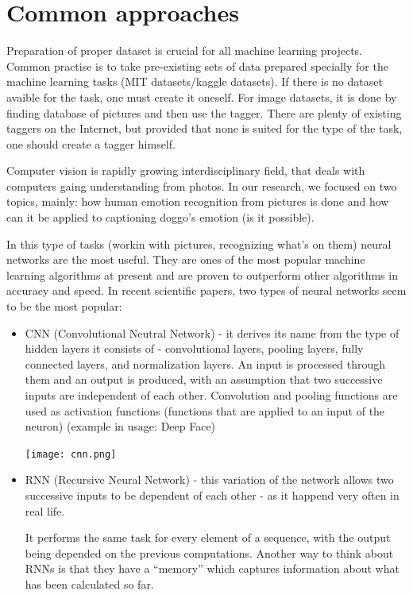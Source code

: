 \documentclass[11pt]{diazessay} %
\begin{document}
\section*{Common approaches}

Preparation of proper dataset is crucial for all machine learning projects. Common practise is to take pre-existing sets of data prepared specially for the machine learning tasks (MIT datasets/kaggle datasets). If there is no dataset avaible for the task, one must create it oneself. For image datasets, it is done by finding database of pictures and then use the tagger. There are plenty of existing taggers on the Internet, but provided that none is suited for the type of the task, one should create a tagger himself.

Computer vision is rapidly growing interdisciplinary field, that deals with computers gaing understanding from photos. In our research, we focused on two topics, mainly: how human emotion recognition from pictures is done and how can it be applied to captioning doggo's emotion (is it possible).

In this type of tasks (workin with pictures, recognizing what's on them) neural networks are the most useful. They are ones of the most popular machine learning algorithms at present and are proven to outperform other algorithms in accuracy and speed. 
In recent scientific papers, two types of neural networks seem to be the most popular: 
\begin{itemize}
	\item CNN (Convolutional Neutral Network) - it derives its name from the type of hidden layers it consists of - convolutional layers, pooling layers, fully connected layers, and normalization layers. An input is processed through them and an output is produced, with an assumption that two successive inputs are independent of each other. 
Convolution and pooling functions are used as activation functions (functions that are applied to an input of the neuron) (example in usage: Deep Face)
	
\begin{center}%
	\texttt{[image: cnn.png]}
\end{center}

	\item RNN (Recursive Neural Network) - this variation of the network allows two successive inputs to be dependent of each other - as it happend very often in real life.
	
It performs the same task for every element of a sequence, with the output being depended on the previous computations. Another way to think about RNNs is that they have a “memory” which captures information about what has been calculated so far.
\end{itemize}
\end{document}
